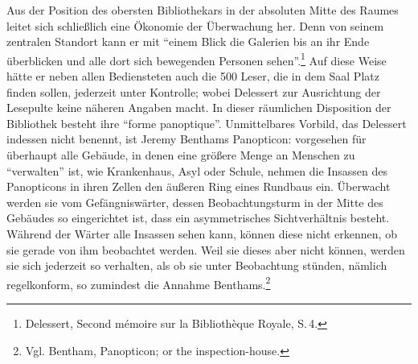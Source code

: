 Aus der Position des obersten Bibliothekars in der absoluten Mitte des
Raumes leitet sich schließlich eine Ökonomie der Überwachung her. Denn
von seinem zentralen Standort kann er mit \enquote{einem Blick die
Galerien bis an ihr Ende überblicken und alle dort sich bewegenden
Personen sehen}.\footnote{Delessert, Second mémoire sur la Bibliothèque
  Royale, S.\,4.} Auf diese Weise hätte er neben allen Bediensteten auch
die 500 Leser, die in dem Saal Platz finden sollen, jederzeit unter
Kontrolle; wobei Delessert zur Ausrichtung der Lesepulte keine näheren
Angaben macht. In dieser räumlichen Disposition der Bibliothek besteht
ihre \enquote{forme panoptique}. Unmittelbares Vorbild, das Delessert
indessen nicht benennt, ist Jeremy Benthams Panopticon: vorgesehen für
überhaupt alle Gebäude, in denen eine größere Menge an Menschen zu
\enquote{verwalten} ist, wie Krankenhaus, Asyl oder Schule, nehmen die
Insassen des Panopticons in ihren Zellen den äußeren Ring eines Rundbaus
ein. Überwacht werden sie vom Gefängniswärter, dessen Beobachtungsturm
in der Mitte des Gebäudes so eingerichtet ist, dass ein asymmetrisches
Sichtverhältnis besteht. Während der Wärter alle Insassen sehen kann,
können diese nicht erkennen, ob sie gerade von ihm beobachtet werden.
Weil sie dieses aber nicht können, werden sie sich jederzeit so
verhalten, als ob sie unter Beobachtung stünden, nämlich regelkonform,
so zumindest die Annahme Benthams.\footnote{Vgl. Bentham, Panopticon; or
  the inspection-house.}

